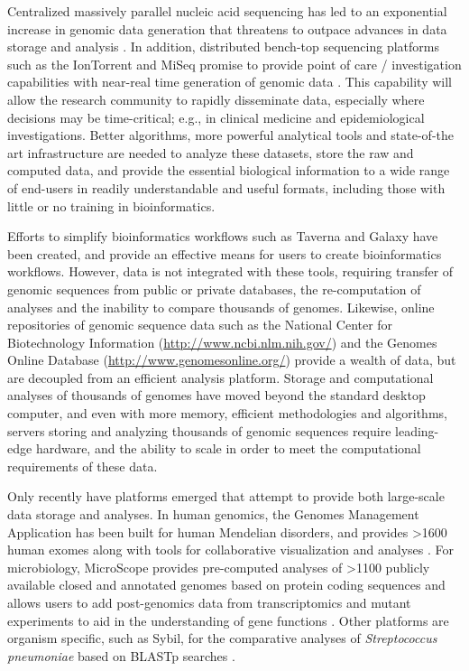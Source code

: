 \documentclass[a4paper,twoside]{article}
\begin{document}
\noindent Centralized massively parallel nucleic acid sequencing has led to an exponential increase in genomic data generation that threatens to outpace advances in data storage and analysis \cite{kahn_future_2011,teeling_current_2012}. In addition, distributed bench-top sequencing platforms such as the IonTorrent and MiSeq promise to provide point of care / investigation capabilities with near-real time generation of genomic data \cite{loman_performance_2012}. This capability will allow the research community to rapidly disseminate data, especially where decisions may be time-critical; e.g., in clinical medicine and epidemiological investigations. Better algorithms, more powerful analytical tools and state-of-the art infrastructure are needed to analyze these datasets, store the raw and computed data, and provide the essential biological information to a wide range of end-users in readily understandable and useful formats, including those with little or no training in bioinformatics.

Efforts to simplify bioinformatics workflows such as Taverna \cite{lanzen_taverna_2008} and Galaxy \cite{goecks_galaxy:_2010} have been created, and provide an effective means for users to create bioinformatics workflows. However, data is not integrated with these tools, requiring transfer of genomic sequences from public or private databases, the re-computation of analyses and the inability to compare thousands of genomes. Likewise, online repositories of genomic sequence data such as the National Center for Biotechnology Information (\url{http://www.ncbi.nlm.nih.gov/}) and the Genomes Online Database (\url{http://www.genomesonline.org/}) provide a wealth of data, but are decoupled from an efficient analysis platform. Storage and computational analyses of thousands of genomes have moved beyond the standard desktop computer, and even with more memory, efficient methodologies and algorithms, servers storing and analyzing thousands of genomic sequences require leading-edge hardware, and the ability to scale in order to meet the computational requirements of these data.

Only recently have platforms emerged that attempt to provide both large-scale data storage and analyses. In human genomics, the Genomes Management Application has been built for human Mendelian disorders, and provides >1600 human exomes along with tools for collaborative visualization and analyses \cite{gonzalez_genomes_2013}. For microbiology, MicroScope provides pre-computed analyses of >1100 publicly available closed and annotated genomes based on protein coding sequences and allows users to add post-genomics data from transcriptomics and mutant experiments to aid in the understanding of gene functions \cite{vallenet_microscope--integrated_2012}. Other platforms are organism specific, such as Sybil, for the comparative analyses of \textit{Streptococcus pneumoniae} based on BLASTp searches \cite{riley_using_2012}.
\end{document}
